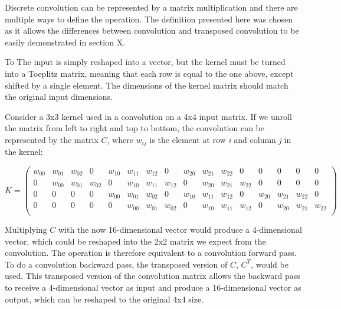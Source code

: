 Discrete convolution can be represented by a matrix multiplication and there are multiple ways to define the operation. The definition presented here was chosen as it allows the differences between convolution and transposed convolution to be easily demonstrated in section X.

\noindent To The input is simply reshaped into a vector, but the kernel must be turned into a Toeplitz matrix, meaning that each row is equal to the one above, except shifted by a single element. The dimensions of the kernel matrix should match the original input dimensions.

\noindent Consider a 3x3 kernel used in a convolution on a 4x4 input matrix. If we unroll the matrix from left to right and top to bottom, the convolution can be represented by the matrix $C$, where \textit{$w_{ij}$} is the element at row \textit{i} and column \textit{j} in the kernel:

\[
    K = 
    \left(
    \begin{smallmatrix}
    \textit{$w_{00}$} & \textit{$w_{01}$} & \textit{$w_{02}$} & 0 & 
    \textit{$w_{10}$} & \textit{$w_{11}$} & \textit{$w_{12}$} & 0 & 
    \textit{$w_{20}$} & \textit{$w_{21}$} & \textit{$w_{22}$} & 0 & 
    0 & 0 & 0 & 0\\
    0 & \textit{$w_{00}$} & \textit{$w_{01}$} & \textit{$w_{02}$} & 
    0 & \textit{$w_{10}$} & \textit{$w_{11}$} & \textit{$w_{12}$} & 
    0 & \textit{$w_{20}$} & \textit{$w_{21}$} & \textit{$w_{22}$} & 
    0 & 0 & 0 & 0\\
    0 & 0 & 0 & 0 & 
    \textit{$w_{00}$} & \textit{$w_{01}$} & \textit{$w_{02}$} & 0 & 
    \textit{$w_{10}$} & \textit{$w_{11}$} & \textit{$w_{12}$} & 0 & 
    \textit{$w_{20}$} & \textit{$w_{21}$} & \textit{$w_{22}$} & 0\\
    0 & 0 & 0 & 0 & 
    0 & \textit{$w_{00}$} & \textit{$w_{01}$} & \textit{$w_{02}$} & 
    0 & \textit{$w_{10}$} & \textit{$w_{11}$} & \textit{$w_{12}$} & 
    0 & \textit{$w_{20}$} & \textit{$w_{21}$} & \textit{$w_{22}$}\\
    \end{smallmatrix}
    \right)
\]

\noindent Multiplying $C$ with the now 16-dimensional vector would produce a 4-dimensional vector, which could be reshaped into the 2x2 matrix we expect from the convolution. The operation is therefore equivalent to a convolution forward pass. To do a convolution backward pass, the transposed version of $C$, $C^T$, would be used. This transposed version of the convolution matrix allows the backward pass to receive a 4-dimensional vector as input and produce a 16-dimensional vector as output, which can be reshaped to the original 4x4 size. \\

